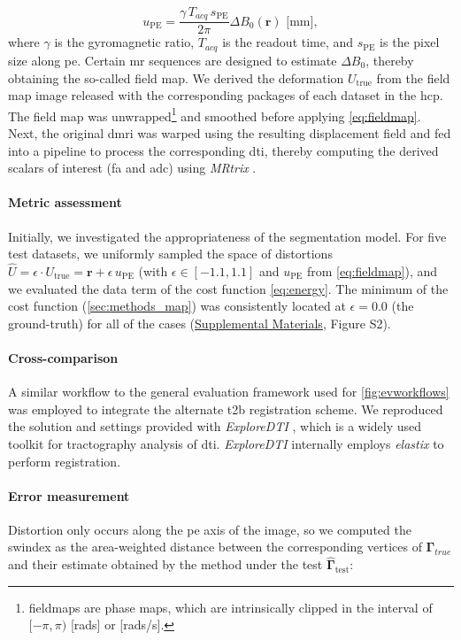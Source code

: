 \documentclass[3p,authoryear,fleqn]{elsarticle}
\providecommand{\gammaset}{\ensuremath{\boldsymbol{\Gamma}}}
\renewcommand{\vec}[1]{\mathbf{#1}}
\providecommand{\suppl}[1]{\href{http://figshare.com/s/459c26b4ee8211e493b306ec4bbcf141}{Supplemental Materials}, #1}
\begin{document}
  \begin{equation}
  u_\text{PE} = \frac{\gamma \, T_{acq}\, s_\text{PE}}{2\pi}\Delta B_0(\vec{r})\text{ [mm]},
  \label{eq:fieldmap}
  \end{equation}
where $\gamma$ is the gyromagnetic ratio, $T_{acq}$ is the readout time, and
  $s_\text{PE}$ is the pixel size along \gls*{pe}.
Certain \gls*{mr} sequences are designed to estimate $\Delta B_0$, thereby obtaining
  the so-called field map.
We derived the deformation $U_\text{true}$ from the field map image released with
  the corresponding packages of each dataset in the \gls*{hcp}.
The field map was unwrapped\footnote{fieldmaps are phase maps, which are intrinsically clipped in the interval
  of $[-\pi, \pi)$ [rads] or [rads/s].} and smoothed before applying \eqref{eq:fieldmap}.
Next, the original \gls*{dmri} was warped using the resulting displacement field and fed into
  a pipeline to process the corresponding \gls*{dti}, thereby computing the derived scalars of
  interest (\gls*{fa} and \gls*{adc}) using \emph{MRtrix} \citep{tournier_mrtrix_2012}.

\paragraph*{Metric assessment}
Initially, we investigated the appropriateness of the segmentation model.
For five test datasets, we uniformly sampled the space of distortions
  $\hat{U} = \epsilon \cdot U_\text{true} = \vec{r} + \epsilon \, u_\text{PE}$
  (with $\epsilon \in [-1.1, 1.1]$ and $u_\text{PE}$ from \eqref{eq:fieldmap}),
  and we evaluated the data term of the cost function \eqref{eq:energy}.
The minimum of the cost function (\autoref{sec:methods_map}) was consistently located at
  $\epsilon=0.0$ (the ground-truth) for all of the cases (\suppl{Figure S2}).

\paragraph*{Cross-comparison}
A similar workflow to the general evaluation framework used for \autoref{fig:evworkflows}
  was employed to integrate the alternate \gls*{t2b} registration scheme.
We reproduced the solution and settings provided with \emph{ExploreDTI}
  \citep{leemans_exploredti_2009}, which is a widely used toolkit for tractography analysis of
  \gls*{dti}.
\emph{ExploreDTI} internally employs \emph{elastix} \citep{klein_elastix_2010} to
  perform registration.

\paragraph*{Error measurement}\label{sec:experiments_evaluation}
Distortion only occurs along the \gls*{pe} axis of the image, so we computed the
  \gls*{swindex} as the area-weighted distance between the corresponding vertices of
  $\gammaset_{true}$ and their estimate obtained by the method under the test $\hat{\gammaset}_\text{test}$:
\end{document}
